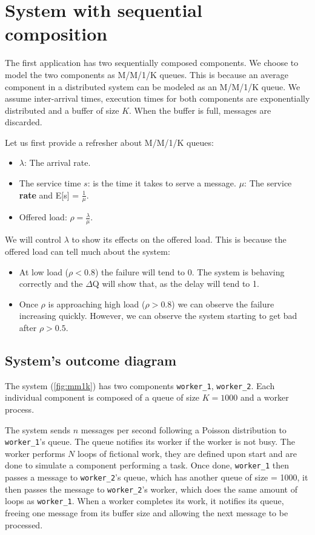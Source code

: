 \section{System with sequential composition}
    The first application has two sequentially composed components. We choose to model the two components as M/M/1/K queues.
    This is because an average component in a distributed system can be modeled as an M/M/1/K queue. We assume inter-arrival times, execution times for both components are exponentially distributed and a buffer of size $K$. When the buffer is full, messages are discarded.
 
    Let us first provide a refresher about M/M/1/K queues:
    \begin{itemize}
        \item $\lambda$: The arrival rate.
        \item The service time $s$: is the time it takes to serve a message.  $\mu$: The service \textbf{rate} and E[s] = $\frac{1}{\mu}$.
        \item Offered load: $\rho = \frac{\lambda}{\mu}$.
    \end{itemize}

    We will control $\lambda$ to show its effects on the offered load. This is because the offered load can tell much about the system:
    \begin{itemize}
        \item At low load ($\rho < 0.8$) the failure will tend to 0. The system is behaving correctly and the $\Delta$Q will show that, as the delay will tend to 1.
        \item Once $\rho$ is approaching high load ($\rho > 0.8$) we can observe the failure increasing quickly. However, we can observe the system starting to get bad after $\rho > 0.5$. \cite{dq-tut}
    \end{itemize}
    
    \subsection{System's outcome diagram}
    The system (\cref{fig:mm1k}) has two components \texttt{worker\_1}, \texttt{worker\_2}. Each individual component is composed of a queue of size $K = 1000$ and a worker process.
    
    The system sends $n$ messages per second following a Poisson distribution to \texttt{worker\_1}'s queue. 
    The queue notifies its worker if the worker is not busy. The worker performs $N$ loops of fictional work, they are defined upon start and are done to simulate a component performing a task. Once done, \texttt{worker\_1} then passes a message to \texttt{worker\_2}'s queue, which has another queue of size = 1000, it then passes the message to \texttt{worker\_2}'s worker, which does the same amount of loops as \texttt{worker\_1}. When a worker completes its work, it notifies its queue, freeing one message from its buffer size and allowing the next message to be processed.
    
